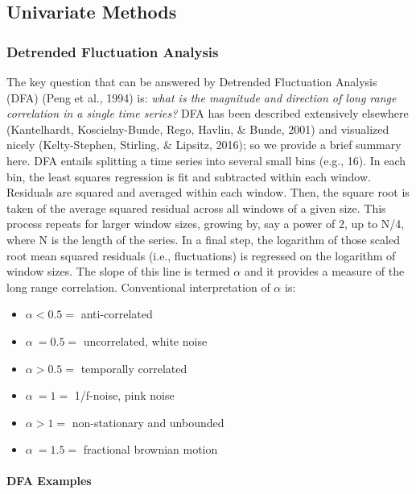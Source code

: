 \documentclass[
  english,
  man]{apa6}
\providecommand{\tightlist}{%
  \setlength{\itemsep}{0pt}\setlength{\parskip}{0pt}}
\let\oldparagraph\paragraph
\renewcommand{\paragraph}[1]{\oldparagraph{#1}\mbox{}}
\begin{document}
\hypertarget{univariate-methods}{%
\subsection{Univariate Methods}\label{univariate-methods}}

\hypertarget{detrended-fluctuation-analysis}{%
\subsubsection{Detrended Fluctuation Analysis}\label{detrended-fluctuation-analysis}}

The key question that can be answered by Detrended Fluctuation Analysis
(DFA) (Peng et al., 1994) is: \emph{what is the magnitude and
direction of long range correlation in a single time series?} DFA has
been described extensively elsewhere
(Kantelhardt, Koscielny-Bunde, Rego, Havlin, \& Bunde, 2001) and visualized nicely
(Kelty-Stephen, Stirling, \& Lipsitz, 2016); so we provide a
brief summary here. DFA entails splitting a time series into several
small bins (e.g., 16). In each bin, the least squares regression is fit
and subtracted within each window. Residuals are squared and averaged
within each window. Then, the square root is taken of the average
squared residual across all windows of a given size. This process
repeats for larger window sizes, growing by, say a power of 2, up to
N/4, where N is the length of the series. In a final step, the logarithm
of those scaled root mean squared residuals (i.e., fluctuations) is
regressed on the logarithm of window sizes. The slope of this line is
termed \(\alpha\) and it provides a measure of the long range correlation.
Conventional interpretation of \(\alpha\) is:

\begin{itemize}
\tightlist
\item
  \(\alpha < 0.5 =\) anti-correlated
\item
  \(\alpha ~= 0.5 =\) uncorrelated, white noise
\item
  \(\alpha > 0.5 =\) temporally correlated
\item
  \(\alpha ~= 1 =\) 1/f-noise, pink noise
\item
  \(\alpha > 1 =\) non-stationary and unbounded
\item
  \(\alpha ~= 1.5 =\) fractional brownian motion
\end{itemize}

\hypertarget{dfa-examples}{%
\paragraph{DFA Examples}\label{dfa-examples}}
\end{document}
